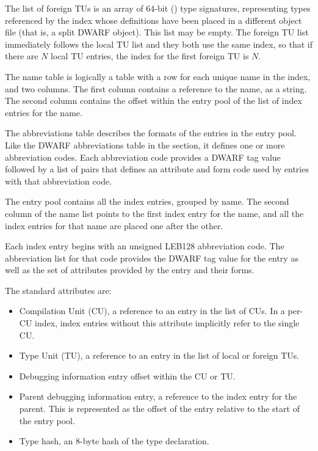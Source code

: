The list of foreign TUs is an array of 64-bit (\DWFORMrefsigeight) type
signatures, representing types referenced by the index whose
definitions have been placed in a different object file (that is, a split
DWARF object). This list may be empty. 
The foreign TU list immediately follows the local TU list 
and they both use the same index, so that if there are $N$ local TU entries, 
the index for the first foreign TU is $N$.

The name table is logically a table with a row for each unique name in
the index, and two columns. The first column contains a reference to
the name, as a string. The second column contains the offset within
the entry pool of the list of index entries for the name.

The abbreviations table describes the formats of the entries in the
entry pool. Like the DWARF abbreviations table in the \dotdebugabbrev{}
section, it defines one or more abbreviation codes. Each abbreviation
code provides a DWARF tag value followed by a list of pairs that
defines an attribute and form code used by entries with that
abbreviation code.

The entry pool contains all the index entries, grouped by name. The
second column of the name list points to the first index entry for the
name, and all the index entries for that name are placed one after the
other.

Each index entry begins with an unsigned LEB128 abbreviation code.
The  abbreviation list for that code provides the DWARF tag value for
the entry as well as the set of attributes provided by the entry and
their forms.

The standard attributes are:
\begin{itemize}
\item Compilation Unit (CU), a reference to an entry in the list of
    CUs. In a per-CU index, index entries without this attribute
    implicitly refer to the single CU.

\item Type Unit (TU), a reference to an entry in the list of local
    or foreign TUs.

\item Debugging information entry offset within the CU or TU.

\item Parent debugging information entry, 
    a reference to the index entry for the parent.
    This is represented as the offset of the entry relative to
    the start of the entry pool.

\item Type hash, an 8-byte hash of the type declaration.

\end{itemize}

